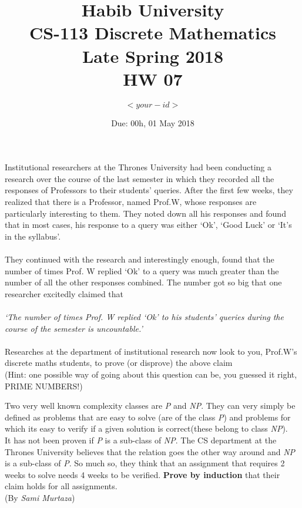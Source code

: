 \documentclass[addpoints]{exam}
\title{Habib University\\CS-113 Discrete Mathematics\\Late Spring 2018\\HW 07}
\author{$<your-id>$}
\date{Due: 00h, 01 May 2018}
\begin{document}
	\maketitle
	\begin{questions}
		
		
		
		\question
		Institutional researchers at the Thrones University had been conducting a research over the course of the last semester in which they recorded all the responses of Professors to their students' queries. After the first few weeks, they realized that there is a Professor, named Prof.W, whose responses are particularly interesting to them. They noted down all his responses and found that in most cases, his response to a query was either `Ok', `Good Luck' or `It's in the syllabus'. \\ \\
		They continued with the research and interestingly enough, found that the number of times Prof. W replied `Ok' to a query was much greater than the number of all the other responses combined. The number got so big that one researcher excitedly claimed that \\ \\ \textit{`The number of times Prof. W replied `Ok' to his students' queries during the course of the semester is uncountable.'} \\ \\
		Researches at the department of institutional research now look to you, Prof.W's discrete maths students, to prove (or disprove) the above claim \\
		(Hint: one possible way of going about this question can be, you guessed it right, PRIME NUMBERS!)
		\begin{solution}
		\end{solution}
		
		
		\question  
		Two very well known complexity classes are \textit{P} and \textit{NP}. They can very simply be defined as problems that are easy to solve (are of the class \textit{P}) and problems for which its easy to verify if a given solution is correct(these belong to class \textit{NP}).\\
		It has not been proven if \textit{P} is a sub-class of \textit{NP}. The CS department at the Thrones University believes that the relation goes the other way around and \textit{NP} is a sub-class of \textit{P}. So much so, they think that an assignment that requires 2 weeks to solve needs 4 weeks to be verified. \textbf{Prove by induction} that their claim holds for all assignments. \\
		(By \textit{Sami Murtaza})
		

\end{questions}
\end{document}
